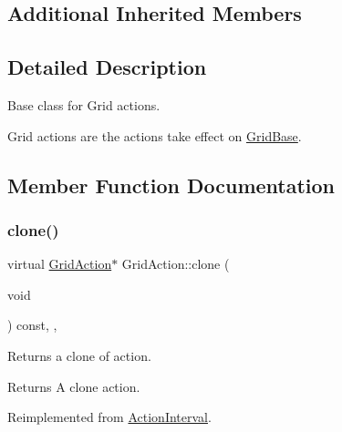 \subsection*{Additional Inherited Members}


\subsection{Detailed Description}
Base class for Grid actions. 

Grid actions are the actions take effect on \hyperlink{classGridBase}{Grid\+Base}. 

\subsection{Member Function Documentation}
\mbox{\label{classGridAction_a081a9340e9289cf2dcbb6bde121d4f24}} 
\subsubsection{\texorpdfstring{clone()}{clone()}\hspace{0.1cm}{\footnotesize\ttfamily [1/2]}}
{\footnotesize\ttfamily virtual \hyperlink{classGridAction}{Grid\+Action}$\ast$ Grid\+Action\+::clone (\begin{DoxyParamCaption}\item[{void}]{ }\end{DoxyParamCaption}) const\hspace{0.3cm}{\ttfamily [inline]}, {\ttfamily [override]}, {\ttfamily [virtual]}}

Returns a clone of action.

\begin{DoxyReturn}{Returns}
A clone action. 
\end{DoxyReturn}


Reimplemented from \hyperlink{classActionInterval_abc93ce0c2f54a90eb216a7803f25f44a}{Action\+Interval}.



